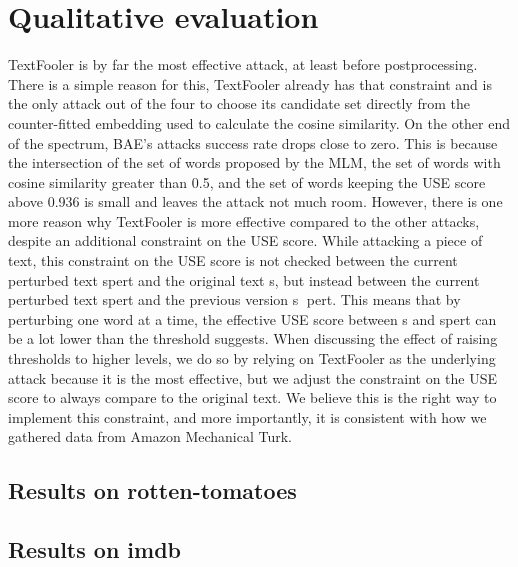 \section{Qualitative evaluation}\label{sec:qualitative-evaluation}

TextFooler is by far the most effective attack, at least before postprocessing. There is a simple reason for this, TextFooler already has that constraint and is the only attack out of the four to choose its candidate set directly from the counter-fitted embedding used to calculate the cosine similarity. On the other end of the spectrum, BAE’s attacks success rate drops close to zero. This is because the intersection of the set of words proposed by the MLM, the set of words with cosine similarity greater than 0.5, and the set of words keeping the USE score above 0.936 is small and leaves the attack not much room.
However, there is one more reason why
TextFooler is more effective compared to the other attacks, despite an additional constraint on the USE score. While attacking a piece of text, this constraint on the USE score is not checked between the current perturbed text spert and the original text s, but instead between the current perturbed text spert and the previous version s
pert. This means
that by perturbing one word at a time, the effective USE score between s and spert can be a lot lower than the threshold suggests. When discussing the effect of raising thresholds to higher levels, we do so by relying on TextFooler as the underlying attack because it is the most effective, but we adjust the constraint on the USE score to always compare to the original text. We believe this is the right way to implement this constraint, and more importantly, it is consistent with how we gathered data from Amazon Mechanical Turk.

\subsection{Results on rotten-tomatoes}\label{subsec:results-rotten-tomatoes}


\subsection{Results on imdb}\label{subsec:results-imdb}


